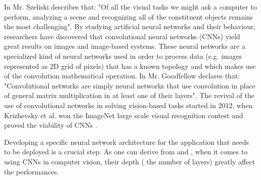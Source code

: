 \documentclass[12pt,a4paper,twoside]{report}
\begin{document}
In \cite{article-cvapp} Mr. Szeliski describes that: "Of all the visual tasks we might ask a computer to perform, analyzing a scene and recognizing all of the constituent objects remains the most challenging". By studying artificial neural networks and their behaviour, researchers have discovered that convolutional neural networks (CNNs) yield great results on images and image-based systems. These neural networks are a specialized kind of neural networks used in order to process data (e.g. images represented as 2D grid of pixels) that has a known topology and which makes use of the convolution mathematical operation. In \cite{book-deeplearning} Mr. Goodfellow declares that: "Convolutional networks are simply neural networks that use convolution in place of general matrix multiplication in at least one of their layers". The revival of the use of convolutional networks in solving vision-based tasks started in 2012, when Krizhevsky et al. won the ImageNet large scale visual recognition contest and proved the viability of CNNs \cite{article-imagenet}. \par
Developing a specific neural network architecture for the application that needs to be deployed is a crucial step. As one can derive from \cite{article-vgg} and \cite{book-deeplearning}, when it comes to using CNNs in computer vision, their depth ( the number of layers) greatly affect the performances. \par
\end{document}

